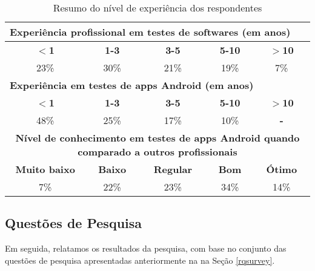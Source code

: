 \begin{table*}[htbp]
\centering
  \def \arraystretch{1.1}
  \footnotesize
  \caption{Resumo do nível de experiência dos respondentes}
    \begin{tabular}{ccccc}
    \toprule
    \multicolumn{5}{l}{\textbf{Experiência profissional em testes de softwares (em anos)}} \\
    \midrule
    \textbf{$<$1} & \textbf{1-3} & \textbf{3-5} & \textbf{5-10} & \textbf{$>$10} \\
    \midrule
    23\%  & 30\%  & 21\%  & 19\%  & 7\% \\
    \midrule
    \multicolumn{5}{l}{\textbf{Experiência em testes de apps Android (em anos)}} \\
    \midrule
    \multicolumn{1}{c}{\textbf{$<$1}} & \textbf{1-3} & \textbf{3-5} & \textbf{5-10} & \textbf{$>$10} \\
    \midrule
    48\%  & 25\%  & 17\%  & 10\%  & {\textbf{-}} \\
    \midrule
    \multicolumn{5}{m{10cm}}{\textbf{Nível de conhecimento em testes de apps Android quando comparado a outros profissionais}} \\
    \midrule
    \textbf{Muito baixo} & \textbf{Baixo} & \textbf{Regular} & \textbf{Bom} & \textbf{Ótimo} \\
    \midrule
    7\%   & 22\%  & 23\%  & 34\%  & 14\% \\
    \bottomrule
    \end{tabular}%
  \label{tab:professionalinformation}%
\end{table*}

\subsection{Questões de Pesquisa}

Em seguida, relatamos os resultados da pesquisa, com base no conjunto das questões de pesquisa apresentadas anteriormente na na Seção \ref{rqsurvey}.

